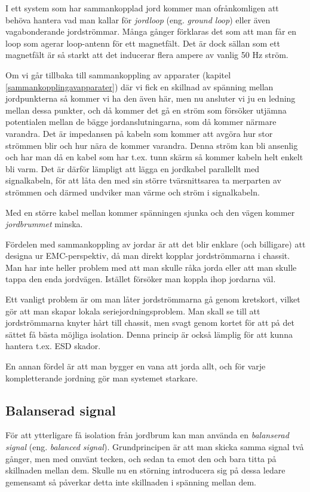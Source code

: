 I ett system som har sammankopplad jord kommer man ofrånkomligen att behöva
hantera vad man kallar för \emph{jordloop} (eng. \emph{ground loop}) eller även
vagabonderande jordströmmar. Många gånger förklaras det som att man får en
loop som agerar loop-antenn för ett magnetfält. Det är dock sällan som ett
magnetfält är så starkt att det inducerar flera ampere av vanlig 50 Hz ström.

Om vi går tillbaka till sammankoppling av apparater (kapitel
\ref{sammankopplingavapparater}) där vi fick en skillnad av spänning mellan
jordpunkterna så kommer vi ha den även här, men nu ansluter vi ju en ledning
mellan dessa punkter, och då kommer det gå en ström som försöker utjämna
potentialen mellan de bägge jordanslutningarna, som då kommer närmare varandra.
Det är impedansen på kabeln som kommer att avgöra hur stor strömmen blir och hur
nära de kommer varandra. Denna ström kan bli ansenlig och har man då en kabel
som har t.ex. tunn skärm så kommer kabeln helt enkelt bli varm. Det är därför
lämpligt att lägga en jordkabel parallellt med signalkabeln, för att låta den
med sin större tvärsnittsarea ta merparten av strömmen och därmed undviker man
värme och ström i signalkabeln.

Med en större kabel mellan kommer spänningen sjunka och den vägen kommer
\emph{jordbrummet} minska.

Fördelen med sammankoppling av jordar är att det blir enklare (och billigare)
att designa ur EMC-perspektiv, då man direkt kopplar jordströmmarna i chassit.
Man har inte heller problem med att man skulle råka jorda eller att man skulle
tappa den enda jordvägen. Istället försöker man koppla ihop jordarna väl.

Ett vanligt problem är om man låter jordströmmarna gå genom kretskort, vilket
gör att man skapar lokala seriejordningsproblem. Man skall se till att
jordströmmarna knyter hårt till chassit, men svagt genom kortet för att på det
sättet få bästa möjliga isolation. Denna princip är också lämplig för att
kunna hantera t.ex. ESD skador.

En annan fördel är att man bygger en vana att jorda allt, och för varje
kompletterande jordning gör man systemet starkare.

\subsection{Balanserad signal}

För att ytterligare få isolation från jordbrum kan man använda en
\emph{balanserad signal} (eng. \emph{balanced signal}). Grundprincipen är att
man skicka samma signal två gånger, men med omvänt tecken, och sedan ta emot
den och bara titta på skillnaden mellan dem. Skulle nu en störning introducera
sig på dessa ledare gemensamt så påverkar detta inte skillnaden i spänning
mellan dem.

